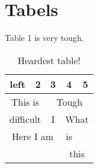 \documentclass[18pt]{article}
\begin{document}
\section*{Tabels} Table 1 is very tough.

\begin{table}[h]
    \centering
    \begin{tabular}{|c|c|c|c|c|}
    \hline
      left &2&3&4&5  \\
      \hline
      \multicolumn{2}{c}{This is} & \multicolumn{3}{c}{Tough}\\
      \cline{3-5}
      \multicolumn{2}{c}{difficult} & I & \multicolumn{2}{|c|}{What}\\
      \cline{1-3}
      \multicolumn{3}{|c|}{Here I am}&\multicolumn{1}{c}{is}&\\
      \hline
      \multicolumn{3}{c}{}&\multicolumn{2}{c}{this}
    \end{tabular}
    \caption{ Heardest table!}
\end{table}
\end{document}
